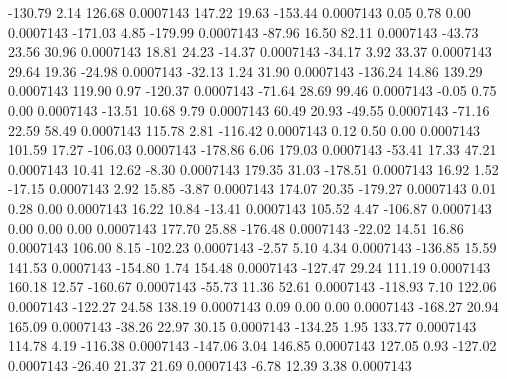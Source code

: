      -130.79        2.14      126.68     0.0007143
      147.22       19.63     -153.44     0.0007143
        0.05        0.78        0.00     0.0007143
     -171.03        4.85     -179.99     0.0007143
      -87.96       16.50       82.11     0.0007143
      -43.73       23.56       30.96     0.0007143
       18.81       24.23      -14.37     0.0007143
      -34.17        3.92       33.37     0.0007143
       29.64       19.36      -24.98     0.0007143
      -32.13        1.24       31.90     0.0007143
     -136.24       14.86      139.29     0.0007143
      119.90        0.97     -120.37     0.0007143
      -71.64       28.69       99.46     0.0007143
       -0.05        0.75        0.00     0.0007143
      -13.51       10.68        9.79     0.0007143
       60.49       20.93      -49.55     0.0007143
      -71.16       22.59       58.49     0.0007143
      115.78        2.81     -116.42     0.0007143
        0.12        0.50        0.00     0.0007143
      101.59       17.27     -106.03     0.0007143
     -178.86        6.06      179.03     0.0007143
      -53.41       17.33       47.21     0.0007143
       10.41       12.62       -8.30     0.0007143
      179.35       31.03     -178.51     0.0007143
       16.92        1.52      -17.15     0.0007143
        2.92       15.85       -3.87     0.0007143
      174.07       20.35     -179.27     0.0007143
        0.01        0.28        0.00     0.0007143
       16.22       10.84      -13.41     0.0007143
      105.52        4.47     -106.87     0.0007143
        0.00        0.00        0.00     0.0007143
      177.70       25.88     -176.48     0.0007143
      -22.02       14.51       16.86     0.0007143
      106.00        8.15     -102.23     0.0007143
       -2.57        5.10        4.34     0.0007143
     -136.85       15.59      141.53     0.0007143
     -154.80        1.74      154.48     0.0007143
     -127.47       29.24      111.19     0.0007143
      160.18       12.57     -160.67     0.0007143
      -55.73       11.36       52.61     0.0007143
     -118.93        7.10      122.06     0.0007143
     -122.27       24.58      138.19     0.0007143
        0.09        0.00        0.00     0.0007143
     -168.27       20.94      165.09     0.0007143
      -38.26       22.97       30.15     0.0007143
     -134.25        1.95      133.77     0.0007143
      114.78        4.19     -116.38     0.0007143
     -147.06        3.04      146.85     0.0007143
      127.05        0.93     -127.02     0.0007143
      -26.40       21.37       21.69     0.0007143
       -6.78       12.39        3.38     0.0007143
